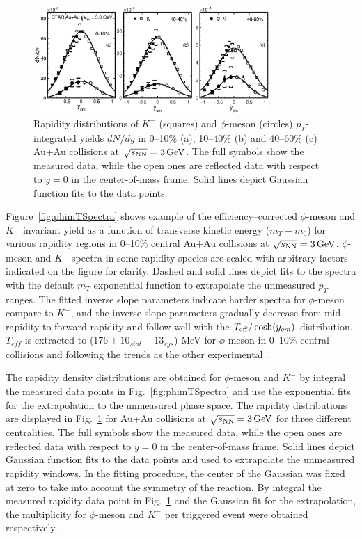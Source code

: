 \documentclass[%
 reprint,	
showpacs,
 amsmath,amssymb,
 aps,
 prc,
]{revtex4-1}
\begin{document}
\begin{figure}
\centering
\includegraphics[width=0.8\textwidth]{fig/fig3_dndy.eps}
  \caption{ Rapidity distributions of $K^-$ (squares) and $\phi$-meson (circles) $p_T$-integrated yields $dN/dy$ in 0--10\% (a), 10--40\% (b) and 40--60\% (c) Au+Au collisions at ${\sqrt{s_{\rm NN}} = \rm{3\,GeV}}$. The full symbols show the measured data, while the open ones are reflected data with respect to $y=0$ in the center-of-mass frame. Solid lines depict Gaussian function fits to the data points.}
\label{fig:phiYSpectra} 
\end{figure}

Figure~\ref{fig:phimTSpectra} shows example of the efficiency--corrected $\phi$-meson and $K^-$ invariant yield as a function of transverse kinetic energy ($m_T-m_0$) for various rapidity regions in 0--10\% central Au+Au collisions at ${\sqrt{s_{\rm NN}} = \rm{3\,GeV}}$. $\phi$-meson and $K^-$ spectra in some rapidity species are scaled with arbitrary factors indicated on the figure for clarity. Dashed and solid lines depict fits to the spectra with the default $m_T$ exponential function to extrapolate the unmeasured $p_T$ ranges. The fitted inverse slope parameters indicate harder spectra for $\phi$-meson compare to $K^-$, and the inverse slope parameters gradually decrease from mid-rapidity to forward rapidity and follow well with the $T_{\rm eff}/\cosh(y_{cm})$ distribution. $T_{eff}$ is extracted to ($176\pm10_{stat}\pm13_{sys}$) MeV for $\phi$ meson in 0--10\% central collisions and following the trends as the other experimental~\cite{2018403,PhysRevC.80.025209,PhysRevC.78.044907}.


The rapidity density distributions are obtained for $\phi$-meson and $K^-$ by integral the measured data points in Fig.~\ref{fig:phimTSpectra} and use the exponential fits for the extrapolation to the unmeasured phase space. The rapidity distributions are displayed in Fig.~\ref{fig:phiYSpectra} for Au+Au collisions at ${\sqrt{s_{\rm NN}} = \rm{3\,GeV}}$ for three different centralities. The full symbols show the measured data, while the open ones are reflected data with respect to $y=0$ in the center-of-mass frame. Solid lines depict Gaussian function fits to the data points and used to extrapolate the unmeasured rapidity windows. In the fitting procedure, the center of the Gaussian was fixed at zero to take into account the symmetry of the reaction. By integral the measured rapidity data point in Fig.~\ref{fig:phiYSpectra} and the Gaussian fit for the extrapolation, the multiplicity for $\phi$-meson and $K^-$ per triggered event were obtained respectively.
\end{document}
